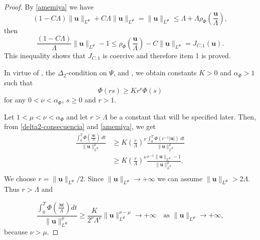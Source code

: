 \documentclass[twoside]{elsarticle}
\theoremstyle{remark}
\newcommand{\orlnor}{\|_{L^{\Phi}}}
\renewcommand{\b}[1]{\boldsymbol{#1}}
\renewcommand{\leq}{\leqslant}
\begin{document}
\begin{proof} By \eqref{amemiya} we have
\[(1-C\Lambda)\|\b{u}\orlnor+C\Lambda\|\b{u}\orlnor=\|\b{u}\orlnor\leq \Lambda +\Lambda \rho_{\Phi}\left(\frac{\b{u}}{\Lambda}\right),\]
then
\[\frac{(1-C\Lambda)}{\Lambda}\|\b{u}\orlnor-1\leq \rho_{\Phi}\left(\frac{\b{u}}{\Lambda}\right)- C\|\b{u}\orlnor=J_{C,1}(\b{u}).\]
This inequality shows that $J_{C,1}$ is coercive and therefore item 1 is proved.  

In virtue of \cite[Eq. (2.8)]{AGMS}, the $\Delta_2$-condition on $\Psi$, \cite[Thm. 11.7]{M} and \cite[Cor. 11.6]{M}, we obtain constants $K>0$ and $\alpha_{\Phi}>1$ such that 
\begin{equation}\label{delta2-consecuencia}
\Phi(r s)\geq Kr^{\nu}\Phi(s)
\end{equation}
for any $0<\nu<\alpha_{\Phi}$,  $s\geq 0$ and $r>1$.

Let $1<\mu<\nu<\alpha_{\Phi}$ and let $r>\Lambda$ be a constant that will be specified later.  
Then, from \eqref{delta2-consecuencia} and \eqref{amemiya}, we get
\[
\begin{split}
\frac{\int_0^T \Phi\left(\frac{|\b{u}|}{\Lambda}\right)\ dt}{\|\b{u}\orlnor^{\mu}}
&\geq
K \left(\frac{r}{\Lambda}\right)^{\nu}\frac{\int_0^T \Phi(r^{-1}|\b{u}|)\ dt}{\|\b{u}\orlnor^{\mu}}\\
&\geq
K \left(\frac{r}{\Lambda}\right)^{\nu}\frac{r^{-1}\|\b{u}\orlnor-1}{\|\b{u}\orlnor^{\mu}}.\\
\end{split}
\]
We choose $r=\|\b{u}\orlnor/2$. Since $\|\b{u}\orlnor\to+\infty$   we can assume $\|\b{u}\orlnor>2\Lambda$.  Thus $r>\Lambda$ and 

\[
\frac{\int_0^T \Phi\left(\frac{|\b{u}|}{\Lambda}\right) dt}{\|\b{u}\orlnor^{\mu}}\geq
\frac{K}{2^{\nu}\Lambda^{\nu}} \|\b{u}\orlnor^{\nu-\mu}\to +\infty\quad\text{as }\|\b{u}\orlnor\to+\infty,
\]
because $\nu>\mu$.


\end{proof}
\end{document}
